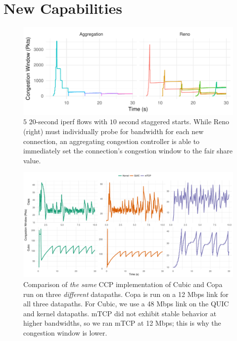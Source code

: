 \section{New Capabilities}
\label{s:capabilities}

\begin{figure}
    \centering
    \includegraphics[width=\columnwidth]{img/stair}
    \caption{$5$ 20-second iperf flows with $10$ second staggered starts. While Reno (right) must individually probe for bandwidth for each new connection, an aggregating congestion controller is able to immediately set the connection's congestion window to the fair share value.}
    \label{fig:cap:agg}
\end{figure}
\begin{figure}[t!]
    \centering
    \includegraphics[width=2\columnwidth]{img/new-wora}
    \caption{Comparison of \textit{the same} CCP implementation of Cubic and Copa run on three \textit{different} datapaths. Copa is run on a 12 Mbps link for all three datapaths. For Cubic, we use a 48 Mbps link on the QUIC and kernel datapaths. mTCP did not exhibit stable behavior at higher bandwidths, so we ran mTCP at 12 Mbps; this is why the congestion window is lower.%
    }\label{fig:datapaths:wora}
\end{figure}

